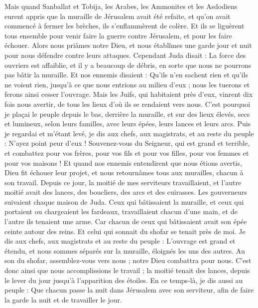 \begin{multicols}{2}
Mais quand Sanballat et Tobija, les Arabes, les Ammonites et les Asdodiens eurent appris que la muraille de Jérusalem avait été refaite, et qu'on avait commencé à fermer les brèches, ils s'enflammèrent de colère.
Et ils se liguèrent tous ensemble pour venir faire la guerre contre Jérusalem, et pour les faire échouer.
Alors nous priâmes notre Dieu, et nous établîmes une garde jour et nuit pour nous défendre contre leurs attaques.
Cependant Juda disait : La force des ouvriers est affaiblie, et il y a beaucoup de débris, en sorte que nous ne pourrons pas bâtir la muraille.
Et nos ennemis disaient : Qu'ils n'en sachent rien et qu'ils ne voient rien, jusqu'à ce que nous entrions au milieu d'eux ; nous les tuerons et ferons ainsi cesser l'ouvrage.
Mais les Juifs, qui habitaient près d’eux, vinrent dix fois nous avertir, de tous les lieux d'où ils se rendaient vers nous.
C'est pourquoi je plaçai le peuple depuis le bas, derrière la muraille, et sur des lieux élevés, secs et lumineux, selon leurs familles, avec leurs épées, leurs lances et leurs arcs.
Puis je regardai et m’étant levé, je dis aux chefs, aux magistrats, et au reste du peuple : N'ayez point peur d'eux ! Souvenez-vous du Seigneur, qui est grand et terrible, et combattez pour vos frères, pour vos fils et pour vos filles, pour vos femmes et pour vos maisons !
Et quand nos ennemis entendirent que nous étions avertis, Dieu fit échouer leur projet, et nous retournâmes tous aux murailles, chacun à son travail.
Depuis ce jour, la moitié de mes serviteurs travaillaient, et l'autre moitié avait des lances, des boucliers, des arcs et des cuirasses. Les gouverneurs suivaient chaque maison de Juda.
Ceux qui bâtissaient la muraille, et ceux qui portaient ou chargeaient les fardeaux, travaillaient chacun d'une main, et de l'autre ils tenaient une arme.
Car chacun de ceux qui bâtissaient avait son épée ceinte autour des reins. Et celui qui sonnait du shofar se tenait près de moi.
Je dis aux chefs, aux magistrats et au reste du peuple : L'ouvrage est grand et étendu, et nous sommes séparés sur la muraille, éloignés les uns des autres.
Au son du shofar, assemblez-vous vers nous ; notre Dieu combattra pour nous.
C'est donc ainsi que nous accomplissions le travail ; la moitié tenait des lances, depuis le lever du jour jusqu'à l’apparition des étoiles.
En ce temps-là, je dis aussi au peuple : Que chacun passe la nuit dans Jérusalem avec son serviteur, afin de faire la garde la nuit et de travailler le jour.

\end{multicols}
